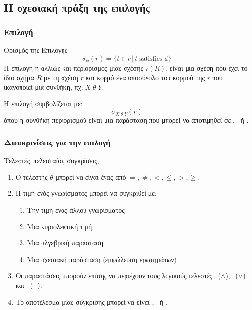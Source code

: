 \subsection[{\en Project}]{\textgreek{Η σχεσιακή πράξη της επιλογής}}

\begin{frame}
\frametitle{Επιλογή}
\begin{minipage}{\wE}
  \begin{block}{Ορισμός της Επιλογής}  \Large
    \[ \sigma_{\phi} (r)  = \{t \in r \,|\, t \; \mathrm{satisfies} \; \phi \} \]
  \normalsize
  Η επιλογή ή αλλιώς και περιορισμός μιας σχέσης $r(R)$,
  είναι μια σχέση που έχει το ίδιο σχήμα $R$
  με τη σχέση $r$
  και κορμό ένα υποσύνολο του κορμού της $r$ που ικανοποιεί μια συνθήκη,
  πχ: $X \; \theta \; Y$.
  \par
  Η επιλογή συμβολίζεται με:
  \[
    \sigma_{X \; \theta \; Y}(r)
  \]
  όπου η συνθήκη περιορισμού είναι μια παράσταση που μπορεί
  να αποτιμηθεί σε \ttrue, \tfalse\ ή \tunk.
  \end{block}
\end{minipage}
\end{frame}


\begin{frame}
\frametitle{Διευκρινίσεις για την επιλογή}
\begin{minipage}{\wE}
  \begin{block}{Τελεστές, τελεσταίοι, συγκρίσεις, \tnull}
    \begin{enumerate} \itemsep9pt
      \item Ο τελεστής $\theta$ μπορεί να είναι ένας από $=, \neq, <, \leq, >, \geq$.
      \item Η τιμή ενός γνωρίσματος μπορεί να συγκριθεί με:
        \begin{enumerate}
          \item Την τιμή ενός άλλου γνωρίσματος
          \item Μια κυριολεκτική τιμή
          \item Μια αλγεβρική παράσταση
          \item Μια σχεσιακή παράσταση ({\bb εμφώλευση ερωτημάτων})  
        \end{enumerate}
      \item Οι παραστάσεις μπορούν επίσης να περιέχουν τους λογικούς
            τελεστές  \tand\ ($\wedge$), \tor\ ($\vee$) και \tnot\ ($\neg$). 
      \item Το αποτέλεσμα μιας σύγκρισης μπορεί να είναι \ttrue, \tfalse\ ή \tunk.      
    \end{enumerate}
  \end{block}
\end{minipage}
\end{frame}



